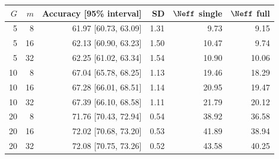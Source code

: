 \begin{tabular}{@{}rrrrrr@{}}
\toprule
$G$ & $m$ & Accuracy [95\% interval] & SD & $\Neff$ single & $\Neff$ full \\
\midrule
5 & 8 & 61.97 [60.73, 63.09] & 1.31 & 9.73 & 9.15 \\
5 & 16 & 62.13 [60.90, 63.23] & 1.50 & 10.47 & 9.74 \\
5 & 32 & 62.25 [61.02, 63.34] & 1.54 & 10.90 & 10.06 \\
10 & 8 & 67.04 [65.78, 68.25] & 1.13 & 19.46 & 18.29 \\
10 & 16 & 67.28 [66.01, 68.51] & 1.14 & 20.95 & 19.47 \\
10 & 32 & 67.39 [66.10, 68.58] & 1.11 & 21.79 & 20.12 \\
20 & 8 & 71.76 [70.43, 72.94] & 0.54 & 38.92 & 36.58 \\
20 & 16 & 72.02 [70.68, 73.20] & 0.53 & 41.89 & 38.94 \\
20 & 32 & 72.08 [70.75, 73.26] & 0.52 & 43.58 & 40.25 \\
\bottomrule
\end{tabular}
